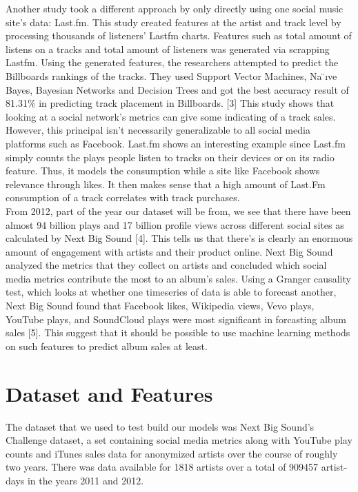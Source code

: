 \documentclass[conference]{IEEEtran}
\begin{document}
Another study took a different approach by only directly using one social music site's data: Last.fm. This study created features at the artist and track level by processing thousands of listeners' Lastfm charts. Features such as total amount of listens on a tracks and total amount of listeners was generated via scrapping Lastfm. Using the generated features, the researchers attempted to predict the Billboards rankings of the tracks. They used Support Vector Machines, Na ̈ıve Bayes, Bayesian Networks and Decision Trees and got the best accuracy result of 81.31\% in predicting track placement in Billboards. [3] This study shows that looking at a social network's metrics can give some indicating of a track sales. However, this principal isn't necessarily generalizable to all social media platforms such as Facebook. Last.fm shows an interesting example since Last.fm simply counts the plays people listen to tracks on their devices or on its radio feature. Thus, it models the consumption while a site like Facebook shows relevance through likes. It then makes sense that a high amount of Last.Fm consumption of a track correlates with track purchases.\\

From 2012, part of the year our dataset will be from, we see that there have been almost 94 billion plays and 17 billion profile views across different social sites as calculated by Next Big Sound [4]. This tells us that there's is clearly an enormous amount of engagement with artists and their product online. Next Big Sound analyzed the metrics that they collect on artists and concluded which social media metrics contribute the most to an album's sales. Using a  Granger causality test, which looks at whether one timeseries of data is able to forecast another, Next Big Sound found that Facebook likes, Wikipedia views, Vevo plays, YouTube plays, and SoundCloud plays were most significant in forcasting album sales [5]. This suggest that it should be possible to use machine learning methods on such features to predict album sales at least.


\section{Dataset and Features}
The dataset that we used to test build our models was Next Big Sound's Challenge dataset, a set containing social media metrics along with YouTube play counts and iTunes sales data for anonymized artists over the course of roughly two years. There was data available for 1818 artists over a total of 909457 artist-days in the years 2011 and 2012.
\end{document}
